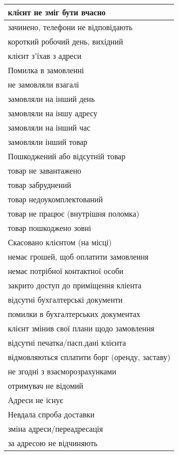 \begin{longtable}[c]{ | p{16cm} | }
	\hline
	клієнт не зміг бути вчасно \\
	\hline
	зачинено, телефони не відповідають \\
	\hline
	короткий робочий день, вихідний \\
	\hline
	клієнт з'їхав з адреси \\
	\hline
	Помилка в замовленні \\
	\nopagebreak\quad не замовляли взагалі \\
	\nopagebreak\quad замовляли на інший день \\
	\nopagebreak\quad замовляли на іншу адресу \\
	\nopagebreak\quad замовляли на інший час \\
	\nopagebreak\quad замовляли інший товар \\
	\hline
	Пошкоджений або відсутній товар \\
	\nopagebreak\quad товар не завантажено  \\
	\nopagebreak\quad товар забруднений \\
	\nopagebreak\quad товар недоукомплектований \\
	\nopagebreak\quad товар не працює (внутрішня поломка) \\
	\nopagebreak\quad товар пошкоджено зовні \\
	\hline
	Скасовано клієнтом (на місці) \\
	\hline
	немає грошей, щоб оплатити замовлення \\
	\hline
	немає потрібної контактної особи \\
	\hline
	закрито доступ до приміщення кліента \\
	\hline
	відсутні бухгалтерські документи \\
	\hline
	помилки в бухгалтерських документах \\
	\hline
	клієнт змінив свої плани щодо замовлення \\
	\hline
	відсутні печатка/пасп.дані клієнта \\
	\hline
	відмовляються сплатити борг (оренду, заставу) \\
	\hline
	не згодні з взаєморозрахунками \\
	\hline
	отримувач не відомий \\
	\hline
	Адреси не існує \\
	\hline
	Невдала спроба доставки \\
	\nopagebreak\quad зміна адреси/переадресація \\
	\nopagebreak\quad за адресою не відчиняють \\

\end{longtable}
